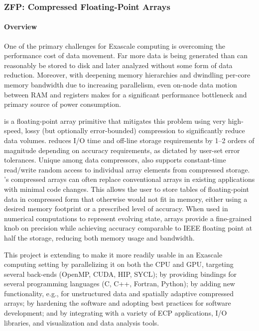 \newcommand{\zfpmilestone}[1]{~(STDM16-#1)}

\subsubsection{ ZFP: Compressed Floating-Point Arrays}

\paragraph{Overview} 

One of the primary challenges for Exascale computing is overcoming the performance cost of data movement.  
Far more data is being generated than can reasonably be stored to disk and later analyzed without some form of data reduction.  
Moreover, with deepening memory hierarchies and dwindling per-core memory bandwidth due to increasing parallelism, even on-node data motion between RAM and registers makes for a significant performance bottleneck and primary source of power consumption.

{\zfp} is a floating-point array primitive that mitigates this problem using
very high-speed, lossy (but optionally error-bounded) compression to
significantly reduce data volumes.  {\zfp} reduces I/O time and off-line
storage requirements by 1--2 orders of magnitude depending on accuracy
requirements, as dictated by user-set error tolerances.  Unique among data
compressors, {\zfp} also supports constant-time read/write random access to
individual array elements from compressed storage.  {\zfp}'s compressed arrays
can often replace conventional arrays in existing applications with minimal
code changes.  This allows the user to store tables of floating-point
data in compressed form that otherwise would not fit in memory, either using
a desired memory footprint or a prescribed level of accuracy.  When used in
numerical computations to represent evolving state, {\zfp} arrays provide a
fine-grained knob on precision while achieving accuracy comparable to IEEE
floating point at half the storage, reducing both memory usage and bandwidth.

This project is extending {\zfp} to make it more readily usable in an Exascale
computing setting by parallelizing it on both the CPU and GPU, targeting
several back-ends (OpenMP, CUDA, HIP, SYCL); by providing bindings for several
programming languages (C, C++, Fortran, Python); by adding new functionality,
e.g., for unstructured data and spatially adaptive compressed arrays; by
hardening the software and adopting best practices for software development;
and by integrating {\zfp} with a variety of ECP applications, I/O libraries,
and visualization and data analysis tools.


